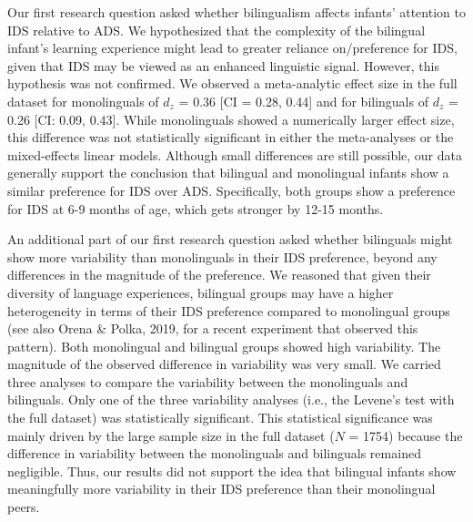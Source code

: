 \documentclass[
  english,
  ,man,floatsintext]{apa6}
\begin{document}
Our first research question asked whether bilingualism affects infants' attention to IDS relative to ADS. We hypothesized that the complexity of the bilingual infant's learning experience might lead to greater reliance on/preference for IDS, given that IDS may be viewed as an enhanced linguistic signal. However, this hypothesis was not confirmed. We observed a meta-analytic effect size in the full dataset for monolinguals of \(d_z\) = 0.36 {[}CI = 0.28, 0.44{]} and for bilinguals of \(d_z\) = 0.26 {[}CI: 0.09, 0.43{]}. While monolinguals showed a numerically larger effect size, this difference was not statistically significant in either the meta-analyses or the mixed-effects linear models. Although small differences are still possible, our data generally support the conclusion that bilingual and monolingual infants show a similar preference for IDS over ADS. Specifically, both groups show a preference for IDS at 6-9 months of age, which gets stronger by 12-15 months.

An additional part of our first research question asked whether bilinguals might show more variability than monolinguals in their IDS preference, beyond any differences in the magnitude of the preference. We reasoned that given their diversity of language experiences, bilingual groups may have a higher heterogeneity in terms of their IDS preference compared to monolingual groups (see also Orena \& Polka, 2019, for a recent experiment that observed this pattern). Both monolingual and bilingual groups showed high variability. The magnitude of the observed difference in variability was very small. We carried three analyses to compare the variability between the monolinguals and bilinguals. Only one of the three variability analyses (i.e., the Levene's test with the full dataset) was statistically significant. This statistical significance was mainly driven by the large sample size in the full dataset (\(N\) = 1754) because the difference in variability between the monolinguals and bilinguals remained negligible. Thus, our results did not support the idea that bilingual infants show meaningfully more variability in their IDS preference than their monolingual peers.
\end{document}
